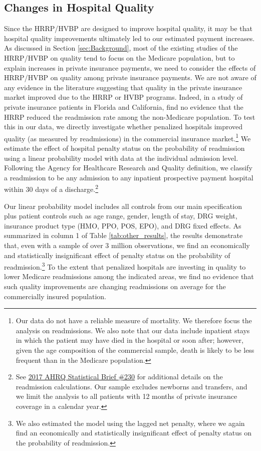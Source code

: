 \documentclass[12pt]{article}
\begin{document}
\subsection{Changes in Hospital Quality}
Since the HRRP/HVBP are designed to improve hospital quality, it may be that hospital quality improvements ultimately led to our estimated payment increases. As discussed in Section \ref{sec:Background}, most of the existing studies of the HRRP/HVBP on quality tend to focus on the Medicare population, but to explain increases in private insurance payments, we need to consider the effects of HRRP/HVBP on quality among private insurance payments. We are not aware of any evidence in the literature suggesting that quality in the private insurance market improved due to the HRRP or HVBP programs. Indeed, in a study of private insurance patients in Florida and California, \cite{demiralp2017} find no evidence that the HRRP reduced the readmission rate among the non-Medicare population. To test this in our data, we directly investigate whether penalized hospitals improved quality (as measured by readmissions) in the commercial insurance market.\footnote{Our data do not have a reliable measure of mortality. We therefore focus the analysis on readmissions. We also note that our data include inpatient stays in which the patient may have died in the hospital or soon after; however, given the age composition of the commercial sample, death is likely to be less frequent than in the Medicare population.} We estimate the effect of hospital penalty status on the probability of readmission using a linear probability model with data at the individual admission level. Following the Agency for Healthcare Research and Quality definition, we classify a readmission to be any admission to any inpatient prospective payment hospital within 30 days of a discharge.\footnote{See \href{https://www.hcup-us.ahrq.gov/reports/statbriefs/sb230-7-Day-Versus-30-Day-Readmissions.jsp?utm_source=ahrq&utm_medium=en1&utm_term=&utm_content=1&utm_campaign=ahrq_en11_7_2017}{2017 AHRQ Statistical Brief \#230} for additional details on the readmission calculations. Our sample excludes newborns and transfers, and we limit the analysis to all patients with 12 months of private insurance coverage in a calendar year.}

Our linear probability model includes all controls from our main specification plus patient controls such as age range, gender, length of stay, DRG weight, insurance product type (HMO, PPO, POS, EPO), and DRG fixed effects. As summarized in column 1 of Table \ref{tab:other_results}, the results demonstrate that, even with a sample of over 3 million observations, we find an economically and statistically insignificant effect of penalty status on the probability of readmission.\footnote{We also estimated the model using the lagged net penalty, where we again find an economically and statistically insignificant effect of penalty status on the probability of readmission.} To the extent that penalized hospitals are investing in quality to lower Medicare readmissions among the indicated areas, we find no evidence that such quality improvements are changing readmissions on average for the commercially insured population.
\end{document}
